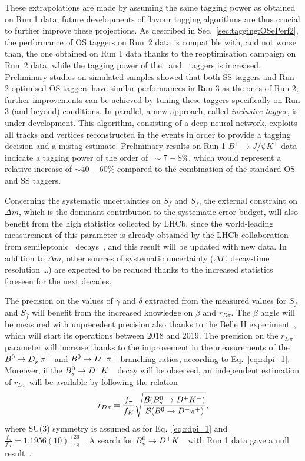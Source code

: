 These extrapolations are made by assuming the same tagging power as obtained on Run 1 data; future developments of flavour tagging algorithms
are thus crucial to further improve these projections. As described in Sec.~\ref{sec:tagging:OSePerf2}, the performance of OS taggers on Run~2 data is
compatible with, and not worse than, the one obtained on Run 1 data thanks to the reoptimisation campaign on Run~2 data, while the tagging power
of the \SSpi~and \SSp~taggers is increased. Preliminary studies on simulated samples showed that both SS taggers and Run 2-optimised OS taggers
have similar performances in Run 3 as the ones of Run 2; further improvements can be achieved by tuning these taggers specifically on Run 3 (and beyond) conditions. In parallel, a new approach, called \emph{inclusive tagger}, is under development. This algorithm, consisting of a deep neural network, exploits
all tracks and vertices reconstructed in the events in order to provide a tagging decision and a mistag estimate. 
Preliminary results on Run 1 $B^+\to J/\psi K^+$ data indicate a tagging power of the order of $~\sim 7-8\%$, which would represent a relative
increase of $\sim 40-60\%$ compared to the combination of the standard OS and SS taggers.
 
Concerning the systematic uncertainties on $S_f$ and $S_{\bar f}$, the external constraint on $\Delta m$, which is the dominant contribution to the systematic error budget, 
will also benefit from the high
statistics collected by LHCb, since the world-leading measurement of this parameter is already obtained by the LHCb collaboration 
from semileptonic \Bz~decays~\cite{LHCB-PAPER-2015-031}, and this result will be updated with new data.
In addition to $\Delta m$, other sources of systematic uncertainty ($\Delta\Gamma$, decay-time resolution \dots) are expected to be reduced thanks to the increased statistics foreseen for the next decades.

The precision on the values of $\gamma$ and $\delta$ extracted from the measured values for $S_f$ and $S_{\bar f}$ will benefit from the increased
knowledge on $\beta$ and $r_{D\pi}$. The $\beta$ angle will be measured with unprecedent precision also thanks to the Belle II experiment~\cite{Aushev:2010bq,Abe:2010gxa}, which will start its operations between 2018 and 2019. 
The precision on the $r_{D\pi}$ parameter will increase thanks to the improvement in the measurements
of the $B^0 \rightarrow D^-_s \pi^+$ and $B^0 \rightarrow D^- \pi^+$ branching ratios, according to Eq.~\ref{eq:rdpi_1}. Moreover, if the $B^0_s\rightarrow D^+ K^-$ decay will be observed, an independent
estimation of $r_{D\pi}$ will be available by following the relation
\begin{equation}
  \label{eq:rdpi_2}
  r_{D\pi} = \frac{f_{\pi}}{f_{K}}\sqrt{\frac{\mathcal{B}(B^0_s \rightarrow D^+ K^-)}{\mathcal{B}(B^0 \rightarrow D^- \pi^+)}}, 
\end{equation}
where SU(3) symmetry is assumed as for Eq.~\ref{eq:rdpi_1} and $\frac{f_{\pi}}{f_{K}}=1.1956(10)^{+26}_{-18}$~\cite{Bazavov:2014wgs}.
A search for $B^0_s\rightarrow D^+ K^-$ with Run 1 data gave a null result~\cite{matthieu}.

